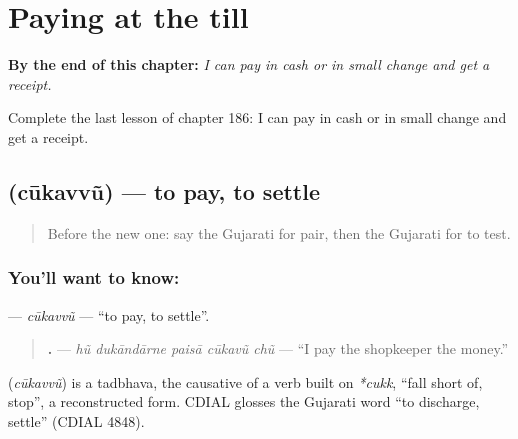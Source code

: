 
\chapter{Paying at the till}
\label{ch:gu-paying-at-the-till}

\begin{chapteropening}
\textbf{By the end of this chapter:} \emph{I can pay in cash or in small change and get a receipt.}

Complete the last lesson of chapter 186: I can pay in cash or in small change and get a receipt.
\end{chapteropening}

\section[\texorpdfstring{\gu{ચૂકવવું} (cūkavvũ)}{ચૂકવવું (cūkavvũ)}]{ (cūkavvũ) — to pay, to settle}

\label{lesson:GU-C186-cukavvu}



\begin{quote}
Before the new one: say the Gujarati for pair, then the Gujarati for to test.
\end{quote}

\subsection*{You'll want to know: }
\textbf{} — \emph{cūkavvũ} — \textquotedblleft{}to pay, to settle\textquotedblright{}.

\begin{quote}
\textbf{    .} — \emph{hũ dukāndārne paisā cūkavũ chũ} — \textquotedblleft{}I pay the shopkeeper the money.\textquotedblright{}
\end{quote}

\begin{cousinweb}
\textbf{} (\emph{cūkavvũ}) is a tadbhava, the causative of a verb built on \emph{*cukk}, \textquotedblleft{}fall short of, stop\textquotedblright{}, a reconstructed form. CDIAL glosses the Gujarati word \textquotedblleft{}to discharge, settle\textquotedblright{} (CDIAL 4848).
\end{cousinweb}

